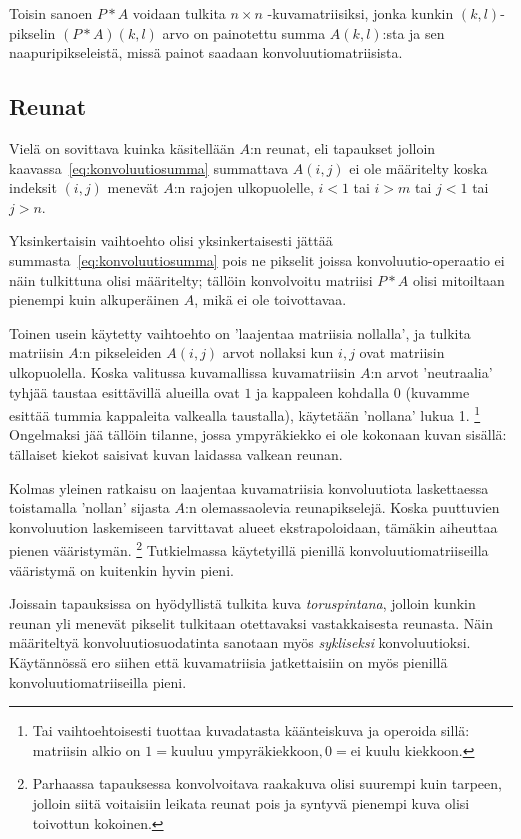 Toisin sanoen $P \ast A$ voidaan tulkita $n \times n$ -kuvamatriisiksi, jonka kunkin $(k,l)$-pikselin $(P \ast A)(k,l)$ arvo on painotettu summa $A(k,l)$:sta ja sen naapuripikseleistä, missä painot saadaan konvoluutiomatriisista.

\subsection{Reunat}
\label{sub:reunat}

Vielä on sovittava kuinka käsitellään $A$:n reunat,
eli tapaukset jolloin kaavassa~\ref{eq:konvoluutiosumma} summattava $A(i, j)$ ei ole määritelty koska indeksit $(i, j)$ menevät $A$:n rajojen ulkopuolelle, $i < 1$ tai $i > m$ tai $j < 1$ tai $j > n$.

Yksinkertaisin vaihtoehto olisi yksinkertaisesti jättää summasta~\ref{eq:konvoluutiosumma} pois ne pikselit joissa konvoluutio-operaatio ei näin tulkittuna olisi määritelty;
tällöin konvolvoitu matriisi $P \ast A$ olisi mitoiltaan pienempi kuin alkuperäinen $A$, mikä ei ole toivottavaa.

Toinen usein käytetty vaihtoehto on 'laajentaa matriisia nollalla', ja tulkita matriisin $A$:n pikseleiden $A(i,j)$ arvot nollaksi kun $i,j$ ovat matriisin ulkopuolella.
Koska valitussa kuvamallissa kuvamatriisin $A$:n arvot 'neutraalia' tyhjää taustaa esittävillä alueilla ovat $1$ ja kappaleen kohdalla $0$ (kuvamme esittää tummia kappaleita valkealla taustalla), käytetään 'nollana' lukua 1.
\footnote{Tai vaihtoehtoisesti tuottaa kuvadatasta käänteiskuva ja operoida sillä: matriisin alkio on $1 = \text{kuuluu ympyräkiekkoon}, 0 = \text{ei kuulu kiekkoon}$.}
Ongelmaksi jää tällöin tilanne, jossa ympyräkiekko ei ole kokonaan kuvan sisällä: tällaiset kiekot saisivat kuvan laidassa valkean reunan.

Kolmas yleinen ratkaisu on laajentaa kuvamatriisia konvoluutiota laskettaessa toistamalla 'nollan' sijasta $A$:n olemassaolevia reunapikselejä.
Koska puuttuvien konvoluution laskemiseen tarvittavat alueet ekstrapoloidaan, tämäkin aiheuttaa pienen vääristymän.
\footnote{Parhaassa tapauksessa konvolvoitava raakakuva olisi suurempi kuin tarpeen, jolloin siitä voitaisiin leikata reunat pois ja syntyvä pienempi kuva olisi toivottun kokoinen.}
Tutkielmassa käytetyillä pienillä konvoluutiomatriiseilla vääristymä on kuitenkin hyvin pieni.
\cite{burger09}

Joissain tapauksissa on hyödyllistä tulkita kuva \emph{toruspintana},
jolloin kunkin reunan yli menevät pikselit tulkitaan otettavaksi vastakkaisesta reunasta.
Näin määriteltyä konvoluutiosuodatinta sanotaan myös \emph{sykliseksi} konvoluutioksi.
Käytännössä ero siihen että kuvamatriisia jatkettaisiin on myös pienillä konvoluutiomatriiseilla pieni.
\cite[104--106]{jähne}

